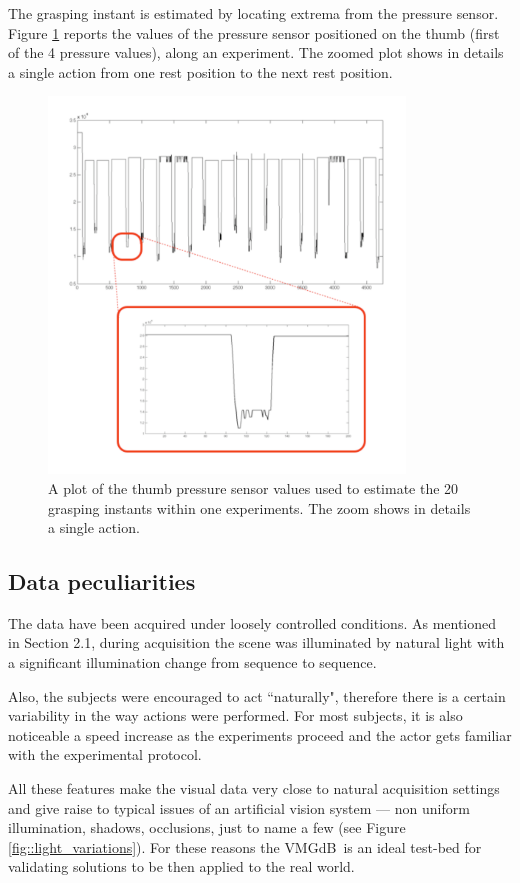 \documentclass{article}
\newcommand{\db}{\textsf{VMGdB}}
\begin{document}
The grasping instant is estimated by locating extrema  from the pressure sensor.
Figure \ref{fig::pressureplot} reports the values of the pressure sensor positioned on the thumb (first of the 4 pressure values), along an experiment. The zoomed plot shows
in details a single action from one rest position to the next rest position. 

\begin{figure}
	\begin{center}
	\includegraphics[height=10cm]{images/pressure_plot.pdf}
	\caption{A plot of the thumb pressure sensor values used to estimate the 20 grasping instants within one experiments. The zoom shows in details a single action.}
	\label{fig::pressureplot}
	\end{center}
\end{figure}

\subsection{Data peculiarities}
The data have been acquired under loosely controlled conditions. As mentioned in Section 2.1, during acquisition the scene was illuminated 
by natural light with a significant illumination change from sequence to sequence. 

Also, the subjects  were encouraged to act ``naturally", 
therefore there is a certain variability in the way actions were performed. For most subjects, it is also noticeable a speed increase as the experiments
proceed and the actor gets familiar with the experimental protocol. 

All these features make the visual data very close to natural acquisition settings and give raise to typical issues of an artificial vision system ---  
non uniform illumination, shadows, occlusions, just to name a few (see Figure \ref{fig::light_variations}). For these reasons the \db\  is an ideal test-bed for validating
solutions to be then applied to the real world.
\end{document}
